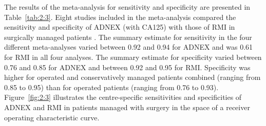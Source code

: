 The results of the meta-analysis for sensitivity and specificity are presented in
Table~\ref{tab:2:3}. Eight studies included in the meta-analysis compared the sensitivity and
specificity of \gls{ADNEX} (with CA125) with those of \gls{RMI} in surgically managed patients
 \cite{vancalsterValidationModelsDiagnose2020,diazOvarianTumorsRisk2017a,tugPreoperativeDiscriminatingPerformance2020,meysEstimatingRiskMalignancy2017,qianComparisonDiagnosticPerformances2021,sandalComparisionRiskMalignancy2018a,wangEvaluatingRiskMalignancy2023,borgesProspectiveExternalValidation2024}.
The summary estimate for sensitivity in the four different meta-analyses varied
between 0.92 and 0.94 for \gls{ADNEX} and was 0.61 for \gls{RMI} in all four analyses. The
summary estimate for specificity varied between 0.76 and 0.85 for \gls{ADNEX} and between
0.92 and 0.95 for \gls{RMI}. Specificity was higher for operated and conservatively managed
patients combined (ranging from 0.85 to 0.95) than for operated patients (ranging
from 0.76 to 0.93). Figure~\ref{fig:2:3} illustrates the centre-specific sensitivities and
specificities of \gls{ADNEX} and \gls{RMI} in patients managed with surgery in the space of a
receiver operating characteristic curve.

